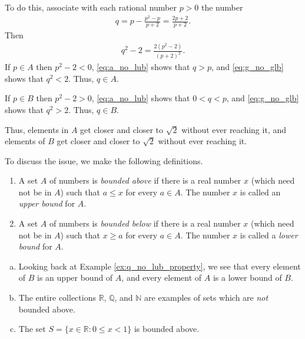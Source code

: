 \documentclass[12pt,letterpaper,reqno]{article}
\numberwithin{equation}{section}
\newcommand{\R}{\ensuremath{\mathbb R}}
\newcommand{\Q}{\ensuremath{\mathbb Q}}
\newcommand{\N}{{\mathbb N}}
\begin{document}
{\begin{example}
To do this, associate with each rational number $p>0$ the number
\begin{align}\label{eq:a_no_lub}
	q=p-\frac{p^2-p}{p+2}=\frac{2p+2}{p+2}.
\end{align}	
Then
\begin{align}\label{eq:g_no_glb}
	q^2-2=\frac{2(p^2-2)}{(p+2)^2}.
\end{align}
If $p \in A$ then $p^2-2<0$,  \eqref{eq:a_no_lub} shows that $q>p$, and \eqref{eq:g_no_glb} shows that $q^2<2$. Thus, $q \in A$.

If $p \in B$ then $p^2-2>0$, \eqref{eq:a_no_lub} shows that $0<q<p$, and \eqref{eq:g_no_glb} shows that $q^2>2$. Thus, $q \in B$.
\end{example}
Thus, elements in $A$ get closer and closer to $\sqrt{2}$ without ever reaching it, and elements of $B$ get closer and closer to $\sqrt{2}$ without ever reaching it.

To discuss the issue, we make the following definitions.

\begin{defn}\hspace{15cm}
	\begin{enumerate}
		\item A set $A$ of numbers is \emph{bounded above} if there is a real number $x$ (which need not be in $A$) such that $a \leq x$ for every $a \in A$. The number $x$ is called an \emph{upper bound} for $A$.
		\item A set $A$ of numbers is \emph{bounded below} if there is a real number $x$ (which need not be in $A$) such that $x \geq a$ for every $a \in A$. The number $x$ is called a \emph{lower bound} for $A$.
	\end{enumerate}  
\end{defn}

\begin{example}\label{ex:exs_lub}
	\begin{enumerate}[(a)]
		\item Looking back at Example \ref{ex:q_no_lub_property}, we see that every element of $B$ is an upper bound of $A$, and every element of $A$ is a lower bound of $B$.
		\item The entire collections $\R$, $\Q$, and $\N$ are examples of sets which are \emph{not} bounded above.
		\item The set $S=\{x \in \R:0 \leq x <1\}$ is bounded above.
	\end{enumerate}
\end{example}

}
\end{document}
